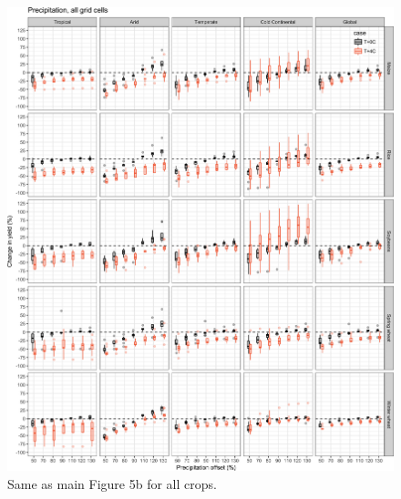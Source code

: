 \documentclass[10pt]{article}
\begin{document}
\begin{figure}[h!]
    \centering
    \includegraphics[width=\textwidth]{s_sim_CG_W.png}
    \caption{Same as main Figure 5b for all crops.}
    \label{fig:water}
\end{figure}
\end{document}

